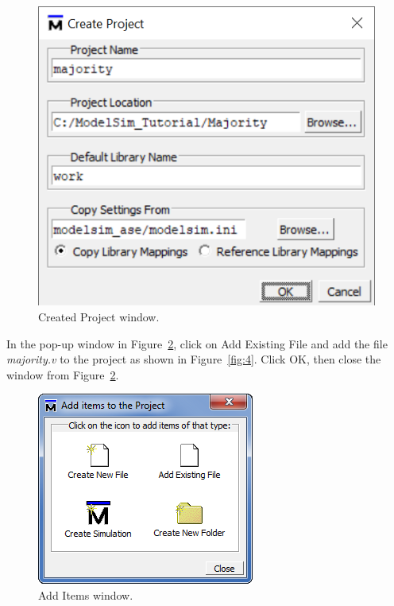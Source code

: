 \documentclass[11pt, twoside, pdftex]{article}
\begin{document}
\begin{figure}[H]
   \begin{center}
      \includegraphics[scale=1.0]{figures/figure2.png}
   \caption{Created Project window.} 
	 \label{fig:2}
	 \end{center}
\end{figure}
\newpage
In the pop-up window in Figure~\ref{fig:3}, click on {\sf Add Existing File} and add the 
file {\it majority.v} to the project as shown in Figure~\ref{fig:4}. Click OK, then close the 
window from Figure~\ref{fig:3}.

\begin{figure}[H]
   \begin{center}
      \includegraphics[scale=0.85]{figures/figure3.png}
   \caption{Add Items window.} 
	 \label{fig:3}
	 \end{center}
\end{figure}
\end{document}
